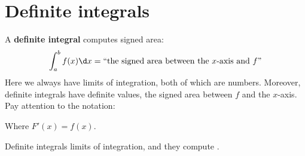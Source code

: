 \documentclass{ximera}
\begin{document}
\section{Definite integrals}

A \textbf{definite integral} computes signed area:
\[
\int_a^b f(x) \d x = \text{``the signed area between the $x$-axis and $f$''}
\]
Here we always have limits of integration, both of which are
numbers. Moreover, definite integrals have definite values, the signed
area between $f$ and the $x$-axis. Pay attention to the notation:
\begin{image}
\end{image}
Where $F'(x) = f(x)$.
\begin{explanation}%
  Definite integrals  limits of integration, and they compute
  .
\end{explanation}
\end{document}
